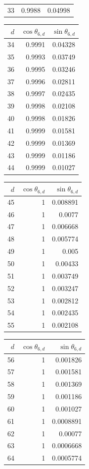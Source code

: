 {\begin{tabular}[t]{r|rr}
33 & 0.9988 & 0.04998
\end{tabular}\kern4pt
\begin{tabular}[t]{r|rr}
$d$ & $\cos\theta_{6,d}$ & $\sin\theta_{6,d}$ \\\hline
34 & 0.9991 & 0.04328 \\
35 & 0.9993 & 0.03749 \\
36 & 0.9995 & 0.03246 \\
37 & 0.9996 & 0.02811 \\
38 & 0.9997 & 0.02435 \\
39 & 0.9998 & 0.02108 \\
40 & 0.9998 & 0.01826 \\
41 & 0.9999 & 0.01581 \\
42 & 0.9999 & 0.01369 \\
43 & 0.9999 & 0.01186 \\
44 & 0.9999 & 0.01027
\end{tabular}\kern4pt
\begin{tabular}[t]{r|rr}
$d$ & $\cos\theta_{6,d}$ & $\sin\theta_{6,d}$ \\\hline
45 & 1 & 0.008891 \\
46 & 1 & 0.0077 \\
47 & 1 & 0.006668 \\
48 & 1 & 0.005774 \\
49 & 1 & 0.005 \\
50 & 1 & 0.00433 \\
51 & 1 & 0.003749 \\
52 & 1 & 0.003247 \\
53 & 1 & 0.002812 \\
54 & 1 & 0.002435 \\
55 & 1 & 0.002108
\end{tabular}\kern4pt
\begin{tabular}[t]{r|rr}
$d$ & $\cos\theta_{6,d}$ & $\sin\theta_{6,d}$ \\\hline
56 & 1 & 0.001826 \\
57 & 1 & 0.001581 \\
58 & 1 & 0.001369 \\
59 & 1 & 0.001186 \\
60 & 1 & 0.001027 \\
61 & 1 & 0.0008891 \\
62 & 1 & 0.00077 \\
63 & 1 & 0.0006668 \\
64 & 1 & 0.0005774
\end{tabular}}

